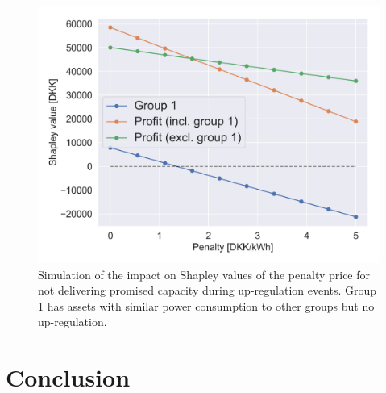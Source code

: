 \documentclass[lettersize,journal]{IEEEtran}
\begin{document}
\begin{figure}[!t]
    \centering
    \includegraphics[width=\columnwidth]{figures/shapley_values.png}
    \caption{Simulation of the impact on Shapley values of the penalty price for not delivering promised capacity during up-regulation events. Group 1 has assets with similar power consumption to other groups but no up-regulation.}
    \label{fig:shapley_values}
\end{figure}

\section{Conclusion}




% 



\vfill
\end{document}
